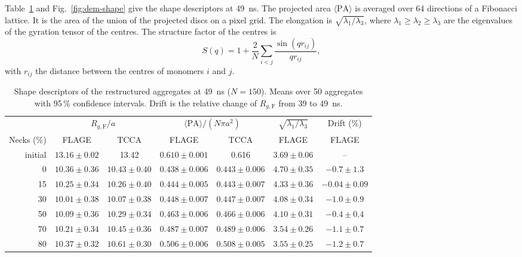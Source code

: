 \documentclass[11pt,a4paper]{article}
\begin{document}
Table~\ref{tab:shape} and Fig.~\ref{fig:dem-shape} give the shape descriptors at \SI{49}{\nano\second}.
The projected area $\langle\text{PA}\rangle$ is averaged over 64 directions of a Fibonacci lattice.
It is the area of the union of the projected discs on a pixel grid.
The elongation is $\sqrt{\lambda_1/\lambda_3}$, where $\lambda_1 \ge \lambda_2 \ge \lambda_3$ are the eigenvalues of the gyration tensor of the centres.
The structure factor of the centres is
\begin{equation}
  S(q) = 1 + \frac{2}{N}\sum_{i<j} \frac{\sin(q r_{ij})}{q r_{ij}} ,
  \label{eq:debye}
\end{equation}
with $r_{ij}$ the distance between the centres of monomers $i$ and $j$.

\begin{table}[htbp]
  \centering
  \caption{Shape descriptors of the restructured aggregates at \SI{49}{\nano\second} ($N = 150$).
  Means over 50 aggregates with 95\,\% confidence intervals.
  Drift is the relative change of $R_{g,\text{F}}$ from 39 to \SI{49}{\nano\second}.}
  \label{tab:shape}
  \small
  \begin{tabular}{rcccccc}
    \toprule
    & \multicolumn{2}{c}{$R_{g,\text{F}}/a$} & \multicolumn{2}{c}{$\langle\text{PA}\rangle/(N\pi a^2)$} & $\sqrt{\lambda_1/\lambda_3}$ & Drift (\%) \\
    \cmidrule(lr){2-3}\cmidrule(lr){4-5}\cmidrule(lr){6-6}\cmidrule(lr){7-7}
    Necks (\%) & FLAGE & TCCA & FLAGE & TCCA & FLAGE & FLAGE \\
    \midrule
    initial & $13.16 \pm 0.02$ & 13.42 & $0.610 \pm 0.001$ & 0.616 & $3.69 \pm 0.06$ & -- \\
    0   & $10.36 \pm 0.36$ & $10.43 \pm 0.40$ & $0.438 \pm 0.006$ & $0.443 \pm 0.006$ & $4.70 \pm 0.35$ & $-0.7 \pm 1.3$ \\
    15  & $10.25 \pm 0.34$ & $10.26 \pm 0.40$ & $0.444 \pm 0.005$ & $0.443 \pm 0.007$ & $4.33 \pm 0.36$ & $-0.04 \pm 0.09$ \\
    30  & $10.01 \pm 0.38$ & $10.07 \pm 0.38$ & $0.448 \pm 0.007$ & $0.447 \pm 0.007$ & $4.08 \pm 0.34$ & $-1.0 \pm 0.9$ \\
    50  & $10.09 \pm 0.36$ & $10.29 \pm 0.34$ & $0.463 \pm 0.006$ & $0.466 \pm 0.006$ & $4.10 \pm 0.31$ & $-0.4 \pm 0.4$ \\
    70  & $10.21 \pm 0.34$ & $10.45 \pm 0.36$ & $0.487 \pm 0.007$ & $0.489 \pm 0.006$ & $3.54 \pm 0.26$ & $-1.1 \pm 0.7$ \\
    80  & $10.37 \pm 0.32$ & $10.61 \pm 0.30$ & $0.506 \pm 0.006$ & $0.508 \pm 0.005$ & $3.55 \pm 0.25$ & $-1.2 \pm 0.7$ \\

\end{tabular}
\end{table}
\end{document}
